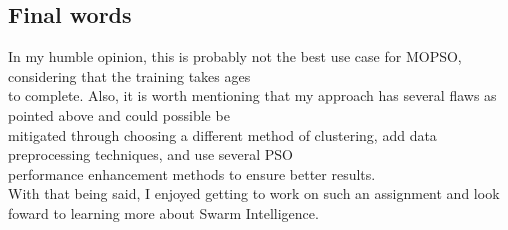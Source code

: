 \begin{flushleft}
    \subsection{Final words}
    In my humble opinion, this is probably not the best use case for MOPSO, considering that the training takes ages \\
    to complete. Also, it is worth mentioning that my approach has several flaws as pointed above and could possible be \\
    mitigated through choosing a different method of clustering, add data preprocessing techniques, and use several PSO \\
    performance enhancement methods to ensure better results. \\
    With that being said, I enjoyed getting to work on such an assignment and look foward to learning more about Swarm Intelligence.\\
\end{flushleft}